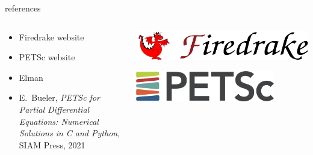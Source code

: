 \documentclass[10pt,hyperref,dvipsnames]{beamer}
\begin{document}
\begin{frame}{references}
\begin{columns}

\begin{column}{0.6\textwidth}
\begin{itemize}
\item Firedrake website
\item PETSc website
\item Elman
\item E.~Bueler, \emph{PETSc for Partial Differential Equations: Numerical Solutions in C and Python}, SIAM Press, 2021
\end{itemize}
\end{column}

\begin{column}{0.4\textwidth}
\includegraphics[width=\textwidth]{figs/firedrakebanner.png}

\bigskip
\hfill \includegraphics[width=0.8\textwidth]{figs/petscbanner.png}


\end{column}
\end{columns}
\end{frame}
\end{document}
